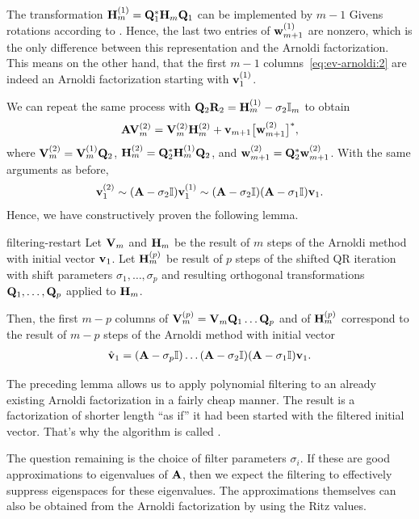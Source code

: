 \begin{intro}
  The transformation $\mathbf H_m^{(1)} = \mathbf Q_1^*\mathbf H_{m}\mathbf Q_1$ can
  be implemented by $m-1$ Givens rotations according to
  . Hence, the last two entries
  of $\mathbf w_{m+1}^{(1)}$ are nonzero, which is the only difference
  between this representation and the Arnoldi factorization. This
  means on the other hand, that the first $m-1$
  columns~\eqref{eq:ev-arnoldi:2} are indeed an Arnoldi factorization
  starting with $\mathbf v_1^{(1)}$.

  We can repeat the same process with
  $\mathbf Q_2\mathbf R_2 = \mathbf H_m^{(1)} - \sigma_2\mathbb I_m$ to obtain
  \begin{gather}
    \mathbf A\mathbf V_m^{(2)} = \mathbf V_m^{(2)} \mathbf H_m^{(2)}
    + \mathbf v_{m+1} \bigl[\mathbf w_{m+1}^{(2)}\bigr]^*,
  \end{gather}
  where $\mathbf V_m^{(2)} = \mathbf V_m^{(1)}\mathbf Q_2$,
  $\mathbf H_m^{(2)} = \mathbf Q_2^*\mathbf H_{m}^{(1)}\mathbf Q_2$, and
  $\mathbf w_{m+1}^{(2)} = \mathbf Q_2^*\mathbf w_{m+1}^{(2)}$.
  With the same arguments as before,
  \begin{gather}
    \mathbf v_1^{(2)} \sim (\mathbf A-\sigma_2\mathbb I)\mathbf v_1^{(1)}
    \sim (\mathbf A-\sigma_2\mathbb I) (\mathbf A-\sigma_1\mathbb I)\mathbf v_1.
  \end{gather}
  Hence, we have constructively proven the following lemma.
\end{intro}

\begin{Lemma}{filtering-restart}
  Let $\mathbf V_m$ and $\mathbf H_m$ be the result of $m$ steps of the
  Arnoldi method with initial vector $\mathbf v_1$. Let $\mathbf H_m^{(p)}$ be
  result of $p$ steps of the shifted QR iteration with shift
  parameters $\sigma_1,\dots,\sigma_p$ and resulting orthogonal
  transformations $\mathbf Q_1,\dots,\mathbf Q_p$ applied to $\mathbf H_m$.

  Then, the first $m-p$ columns of
  $\mathbf V_m^{(p)} = \mathbf V_m\mathbf Q_1\dots\mathbf Q_p$ and of $\mathbf H_m^{(p)}$
  correspond to the result of $m-p$ steps of the Arnoldi method with
  initial vector
  \begin{gather}
    \hat{\mathbf v}_1 = (\mathbf A-\sigma_p\mathbb I)\dots(\mathbf A-\sigma_2\mathbb I)(\mathbf A-\sigma_1\mathbb I)
    \mathbf v_1.
  \end{gather}
\end{Lemma}

\begin{intro}
  The preceding lemma allows us to apply polynomial filtering to an
  already existing Arnoldi factorization in a fairly cheap manner. The
  result is a factorization of shorter length ``as if'' it had been
  started with the filtered initial vector. That's why the algorithm
  is called .

  The question remaining is the choice of filter parameters
  $\sigma_i$. If these are good approximations to eigenvalues of
  $\mathbf A$, then we expect the filtering to effectively suppress
  eigenspaces for these eigenvalues. The approximations themselves can
  also be obtained from the Arnoldi factorization by using the Ritz
  values.
\end{intro}

